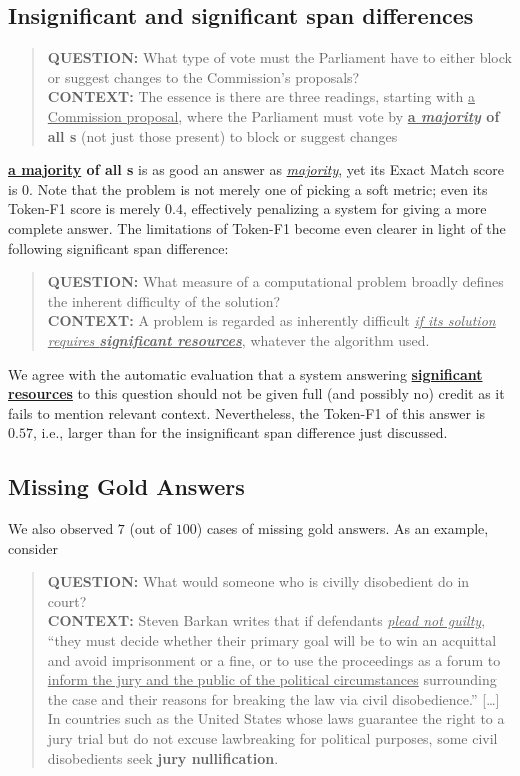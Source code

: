 \subsection{Insignificant and significant span differences}
\begin{quote}
    {\bf QUESTION:}
    What type of vote must the Parliament have to either block or suggest changes to the Commission's proposals? \\
    {\bf CONTEXT:}
    The essence is there are three readings, starting with \underline{a Commission proposal}, where the Parliament must vote by \textbf{\underline{a \textit{majority}} of all s} (not just those present) to block or suggest changes
\end{quote}
\textbf{\underline{a majority} of all s} is as good an answer as \textit{\underline{majority}},
yet its Exact Match score is $0$.  Note that the problem is not merely one of picking a soft metric;
even its Token-F1 score is merely  $0.4$, effectively penalizing a system for giving a more complete
answer.  The limitations of Token-F1 become even clearer in light of the following significant span difference:
\begin{quote}
    {\bf QUESTION:} What measure of a computational problem broadly
    defines the inherent difficulty of the solution?  \\
   {\bf CONTEXT:}
    A problem is regarded as inherently difficult
    \underline{\textit{if its solution requires \textbf{significant
          resources}}}, whatever the algorithm used.
\end{quote}

We agree with the automatic evaluation that a system answering
\underline{\textbf{significant resources}} to this question should not
be given full (and possibly no) credit as it fails to mention relevant
context.
Nevertheless, the Token-F1 of this answer is $0.57$, i.e., larger than
for the insignificant span difference just discussed.

\subsection{Missing Gold Answers}

We also observed $7$ (out of $100$) cases of missing gold answers.  As an example, consider
\begin{quote}
    {\bf QUESTION:}
    What would someone who is civilly disobedient do in court?
 \\
    {\bf CONTEXT:} 
    Steven Barkan writes that if defendants \textit{\underline{plead not guilty}}, ``they must decide whether their primary goal will be to win an acquittal and avoid imprisonment or a fine, or to use the proceedings as a forum to \uline{inform the jury and the public of the political circumstances} surrounding the case and their reasons for breaking the law via civil disobedience.'' [\dots] \\
    In countries such as the United States whose laws guarantee the right to a jury trial but do not excuse lawbreaking for political purposes, some civil disobedients seek \textbf{jury nullification}.
\end{quote}


